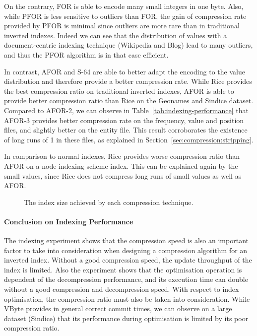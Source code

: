 On the contrary, FOR is able to encode many small
integers in one byte. Also, while PFOR is less sensitive to outliers than FOR,
the gain of compression rate provided by PFOR is minimal since outliers are
more rare than in traditional inverted indexes. Indeed we can see that the
distribution of values with a document-centric indexing technique (Wikipedia
and Blog) lead to many outliers, and thus the PFOR algorithm is in that case
efficient.

In contrast, AFOR and S-64 are able to better adapt the encoding to
the value distribution and therefore provide a better compression rate. While
Rice provides the best compression ratio on traditional inverted indexes, AFOR
is able to provide better compression ratio than Rice on the Geonames and
Sindice dataset. Compared to AFOR-2, we can observe in
Table~\ref{tab:indexing-performance} that AFOR-3 provides better compression
rate on the frequency, value and position files, and slightly better on the
entity file. This result corroborates the existence of long runs of 1 in these
files, as explained in Section~\ref{sec:compression:stripping}.

In comparison to normal indexes, Rice provides worse compression ratio than
AFOR on a node indexing scheme index. This can be explained again by the small
values, since Rice does not compress long runs of small values as well as AFOR.

\begin{figure}
\centering
\begin{minipage}{0.8\linewidth}
  \centering
    \resizebox{0.7\linewidth}{!}{%
    
  }
  \quad
  \resizebox{\linewidth}{!}{%
    
  }
	\caption{The index size achieved by each compression technique.}
	\label{fig:index-size}
\end{minipage}
\end{figure}

\paragraph{Conclusion on Indexing Performance}

The indexing experiment shows that the compression speed is also an important
factor to take into consideration when designing a compression algorithm for
an inverted index. Without a good compression speed, the update throughput of
the index is limited. Also the experiment shows that the optimisation
operation is dependent of the decompression performance, and its execution
time can double without a good compression and decompression speed. With
respect to index optimisation, the compression ratio must also be taken into
consideration. While VByte provides in general correct commit times, we can
observe on a large dataset (Sindice) that its performance during optimisation
is limited by its poor compression ratio.

